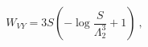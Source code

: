 \begin{equation}
\label{perti}
W_{VY}=3S \left(-\log{\frac{S}{\Lambda_2^3}}+1 \right) \ ,
\end{equation}

